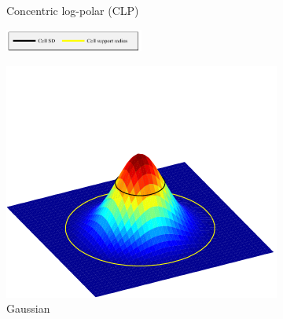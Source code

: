 \documentclass[thesis.tex]{subfiles}
\begin{document}
\begin{figure}[p]
\begin{subfigure}[t]{0.32\textwidth}
		\caption{Concentric log-polar (CLP)}
		\label{fig:gridTypeClp}
	\end{subfigure}
	\caption{Examples of cell grid types centered around a detected interest point, showing cell centers, 1 standard deviation curves (see ), detection scales, and grid radii. The grid size here is $8 \times 2$ (8 cells in each of 2 rings) and the grid radius $r$ is set to 10, which is relative to the detection scale. The polar grids utilize polar Gaussian aperture cell functions while the log-polar use Cartesian Gaussian aperture cell functions.}
	\label{fig:gridType}
	\vspace{5mm}
		\begin{subfigure}[t]{\textwidth}
		\centering
		\includegraphics[width=0.5\textwidth]{img/cellWindow_legend.pdf}
	\end{subfigure}
	\begin{subfigure}[t]{0.40\textwidth}
		\includegraphics[width=\textwidth, clip=true, trim=0 0 0 90]{img/cellWindow.pdf}
		\caption{Gaussian}
		\label{fig:cellWindow}
	\end{subfigure}
	\begin{subfigure}[t]{0.40\textwidth}

\end{subfigure}
\end{figure}
\end{document}
